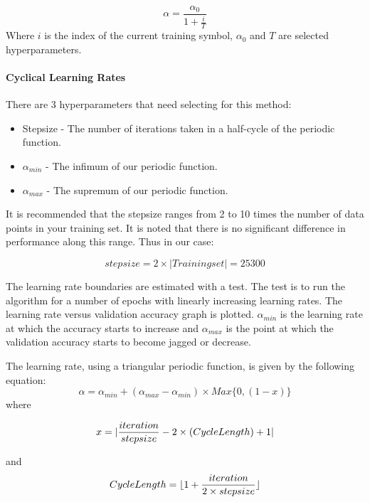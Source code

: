 \documentclass{article}
\begin{document}
\begin{equation}
	\alpha = \frac{\alpha_0}{1 + \frac{i}{T}}
\end{equation}
Where $i$ is the index of the current training symbol, $\alpha_0$ and $T$ are selected hyperparameters.
\paragraph{Cyclical Learning Rates}
There are 3 hyperparameters that need selecting for this method:
\begin{itemize}
	\item Stepsize - The number of iterations taken in a half-cycle of the periodic function.
	\item $\alpha_{min}$ - The infimum of our periodic function.
	\item $\alpha_{max}$ - The supremum of our periodic function.
\end{itemize}

It is recommended that the stepsize ranges from 2 to 10 times the number of data points in your training set. It is noted that there is no significant difference in performance along this range.
Thus in our case:

\begin{equation}
stepsize = 2 \times |Training set| = 25300
\end{equation}

The learning rate boundaries are estimated with a test. The test is to run the algorithm for a number of epochs with linearly increasing learning rates. The learning rate versus validation accuracy graph is plotted. $\alpha_{min}$ is the learning rate at which the accuracy starts to increase and $\alpha_{max}$ is the point at which the validation accuracy starts to become jagged or decrease.

The learning rate, using a triangular periodic function, is given by the following equation:
\begin{equation}
	\alpha = \alpha_{min} + (\alpha_{max} - \alpha_{min})\times Max\{0, (1-x)\}
\end{equation}
where 

\begin{equation}
	x = |\frac{iteration}{stepsize} -2\times{(Cycle \space Length)} + 1|
\end{equation}


and \begin{equation}
Cycle \space Length = \lfloor{1 + \frac{iteration}{2\times{stepsize}}}\rfloor
\end{equation}
\end{document}
